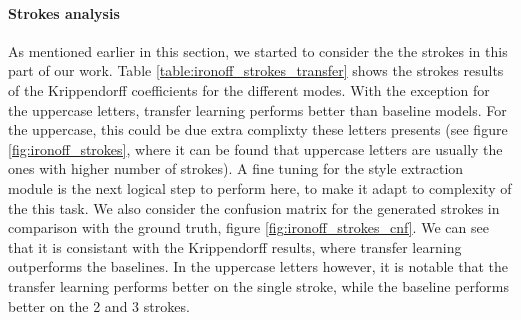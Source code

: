     \paragraph{Strokes analysis}
    As mentioned earlier in this section, we started to consider the the strokes in this part of our work. Table \ref{table:ironoff_strokes_transfer} shows the strokes results of the Krippendorff coefficients for the different modes. With the exception for the uppercase letters, transfer learning performs better than baseline models. For the uppercase, this could be due extra complixty these letters presents (see figure \ref{fig:ironoff_strokes}, where it can be found that uppercase letters are usually the ones with higher number of strokes). A fine tuning for the style extraction module is the next logical step to perform here, to make it adapt to complexity of the this task. We also consider the confusion matrix for the generated strokes in comparison with the ground truth, figure \ref{fig:ironoff_strokes_cnf}. We can see that it is consistant with the Krippendorff results, where transfer learning outperforms the baselines. In the uppercase letters however, it is notable that the transfer learning performs better on the single stroke, while the baseline performs better on the 2 and 3 strokes.

